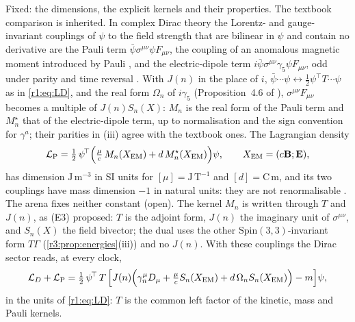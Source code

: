 Fixed: the dimensions, the explicit kernels and their properties. The textbook
comparison is inherited. In complex Dirac theory the Lorentz- and gauge-invariant couplings of $\psi$ to the field strength that are bilinear in
$\psi$ and contain no derivative are the Pauli term $\bar\psi\sigma^{\mu\nu}\psi F_{\mu\nu}$, the coupling of an anomalous magnetic moment introduced by
Pauli \cite{Pauli41}, and the electric-dipole term $i\bar\psi\sigma^{\mu\nu}\gamma_5\psi F_{\mu\nu}$, odd under parity and time reversal
\cite{PeskinSchroeder,ItzyksonZuber}. With $J(n)$ in the place of $i$, $\bar\psi\cdots\psi\leftrightarrow\tfrac12\psi^{\!\top}T\cdots\psi$ as in \cref{r1:eq:LD}, and the real
form $\Omega_n$ of $i\gamma_5$ (Proposition~4.6 of \cite{ES17}), $\sigma^{\mu\nu}F_{\mu\nu}$ becomes a multiple of $J(n)S_n(X)$: $M_n$ is the real form of the Pauli term
and $M^\star_n$ that of the electric-dipole term, up to normalisation and the sign convention for $\gamma^a$; their parities in (iii) agree with the
textbook ones. The Lagrangian density
\begin{equation}
\label{r4:eq:LP}
\mathcal L_{\rm P}=\tfrac12\,\psi^{\!\top}\Bigl(\tfrac{\mu}{c}\,M_n(X_{\rm EM})+d\,M^\star_n(X_{\rm EM})\Bigr)\psi,\qquad X_{\rm EM}=(c\mathbf B;\mathbf E),
\end{equation}
has dimension $\mathrm{J\,m^{-3}}$ in SI units for $[\mu]=\mathrm{J\,T^{-1}}$ and $[d]=\mathrm{C\,m}$, and its two couplings have mass dimension $-1$ in natural units: they
are not renormalisable \cite{PeskinSchroeder}. The arena fixes neither constant (open). The kernel $M_n$ is written through $T$ and $J(n)$, as (E3) proposed:
$T$ is the adjoint form, $J(n)$ the imaginary unit of $\sigma^{\mu\nu}$, and $S_n(X)$ the field bivector; the dual uses the other $\mathrm{Spin}(3,3)$-invariant
form $T\Gamma$ (\cref{r3:prop:energies}(iii)) and no $J(n)$. With these couplings the Dirac sector reads, at every clock,
\[
\mathcal L_D+\mathcal L_{\rm P}=\tfrac12\,\psi^{\!\top}\,T\,\Bigl[J(n)\Bigl(\gamma^\mu_nD_\mu+\tfrac{\mu}{c}S_n(X_{\rm EM})+d\,\Omega_nS_n(X_{\rm EM})\Bigr)-m\Bigr]\psi,
\]
in the units of \cref{r1:eq:LD}: $T$ is the common left factor of the kinetic, mass and Pauli kernels.

